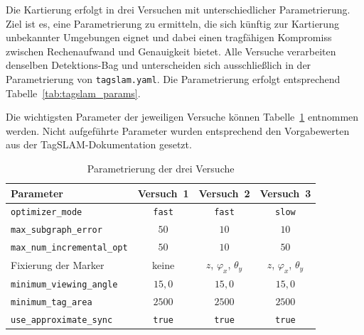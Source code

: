 Die Kartierung erfolgt in drei Versuchen mit unterschiedlicher Parametrierung.
Ziel ist es, eine Parametrierung zu ermitteln, die sich künftig zur Kartierung unbekannter 
Umgebungen eignet und dabei einen tragfähigen Kompromiss zwischen Rechenaufwand und Genauigkeit bietet.
Alle Versuche verarbeiten denselben Detektions-Bag und unterscheiden sich ausschließlich in der Parametrierung von \texttt{tagslam.yaml}.
Die Parametrierung erfolgt entsprechend Tabelle~\ref{tab:tagslam_params}.

Die wichtigsten Parameter der jeweiligen Versuche können Tabelle~\ref{tab:tagslam_params_laeufe} entnommen werden.
Nicht aufgeführte Parameter wurden entsprechend den Vorgabewerten aus der TagSLAM-Dokumentation gesetzt.
\begin{table}[htbp]
\centering
\begin{tabular}{lccc}
\toprule
\textbf{Parameter} & \textbf{Versuch~1} & \textbf{Versuch~2} & \textbf{Versuch~3} \\
\midrule
\texttt{optimizer\_mode}            & \texttt{fast} & \texttt{fast} & \texttt{slow} \\
\texttt{max\_subgraph\_error}       & $50$            & $10$            & $10$ \\
\texttt{max\_num\_incremental\_opt} & $50$          & $10$          & $50$ \\
\midrule
Fixierung der Marker                & keine         & $z$, $\varphi_x$, $\theta_y$ & $z$, $\varphi_x$, $\theta_y$\\
\texttt{minimum\_viewing\_angle}                & $15{,}0$ & $15{,}0$ & $15{,}0$ \\
\texttt{minimum\_tag\_area}                     & $2500$ & $2500$ & $2500$ \\
\texttt{use\_approximate\_sync}                 & \texttt{true} & \texttt{true} & \texttt{true} \\
\bottomrule
\end{tabular}
\caption[Parametrierung der drei Versuche]{Parametrierung der drei Versuche}
\label{tab:tagslam_params_laeufe}
\end{table}
\FloatBarrier



